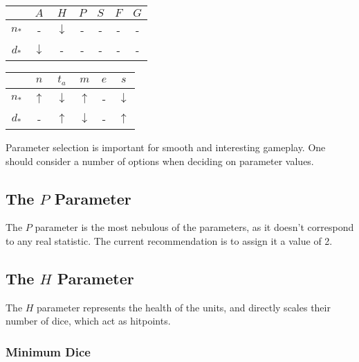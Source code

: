 \begin{table}
\begin{tabular}{c|c|c|c|c|c|c}
            &   $A$             &   $H$             &   $P$ &   $S$ &   $F$ &   $G$ \\
    \hline
    $n_*$   &   -               &   $\downarrow$    &   -   &   -   &   -   &   -   \\
    $d_*$   &   $\downarrow$    &   -               &   -   &   -   &   -   &   -
\end{tabular}
\end{table}

\begin{table}
\begin{tabular}{c|c|c|c|c|c}
            &   $n$             &   $t_a$           &   $m$             &   $e$             &   $s$             \\
    \hline
    $n_*$   &   $\uparrow$      &   $\downarrow$    &   $\uparrow$      &   -               &   $\downarrow$    \\
    $d_*$   &   -               &   $\uparrow$      &   $\downarrow$    &   -               &   $\uparrow$      \\
\end{tabular}
\end{table}

Parameter selection is important for smooth and interesting gameplay.
One should consider a number of options when deciding on parameter values.

\subsection{The $P$ Parameter}

The $P$ parameter is the most nebulous of the parameters,
as it doesn't correspond to any real statistic.
The current recommendation is to assign it a value of 2.

\subsection{The $H$ Parameter}

The $H$ parameter represents the health of the units,
and directly scales their number of dice, which act as hitpoints.

\subsubsection{Minimum Dice}

